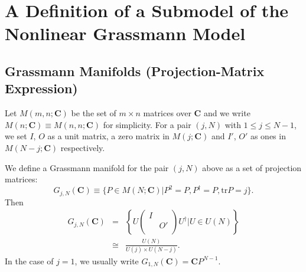 \documentclass[makeidx,12pt,openany]{report}
\begin{document}
\chapter{A Definition of a Submodel of the Nonlinear Grassmann Model}
\section{Grassmann Manifolds (Projection-Matrix Expression)}
 \label{section:GraIntro}

Let $M(m,n;{\mathbf{C}})$ be the set of $m \times n$ matrices over $\mathbf{C}$ and we write $M(n;{\mathbf{C}}) \equiv M(n,n;{\mathbf{C}})$ for simplicity. For a pair $(j,N)$ with $1 \le j \le N-1$, we set $I$, $O$ as a unit matrix, a zero matrix in $M(j;{\mathbf{C}})$ and  $I'$, $O'$ as ones in $M(N-j;{\mathbf{C}})$ respectively.

We define a Grassmann manifold for the pair $(j,N)$ above as a set of 
projection matrices: 
\begin{equation}
 G_{j,N}({\mathbf{C}}) \equiv \{ P \in M(N;{\mathbf{C}})| P^2=P, P^{\dag}=P, \mbox{tr}P=j \}.
\end{equation}
Then 
\begin{eqnarray}
 G_{j,N}({\mathbf{C}}) 
 &=&
 \left\{ U
          \left(
           \begin{array}{cc}
               I &    \\
                 & O' \\
            \end{array}
           \right)
            U^{\dag}|U \in U(N) \right\}  \label{eqn:n1-2}\\
 &\cong& \displaystyle{\frac{U(N)}{U(j) \times U(N-j)}}.\label{eqn:n1-3}
\end{eqnarray}
In the case of $j=1$, we usually write $G_{1,N}({\mathbf{C}})=
{\mathbf{C}}P^{N-1}$. 
\end{document}
